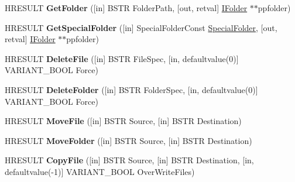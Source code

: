 \begin{DoxyCompactItemize}
H\+R\+E\+S\+U\+LT {\bfseries Get\+Folder} (\mbox{[}in\mbox{]} B\+S\+TR Folder\+Path, \mbox{[}out, retval\mbox{]} \hyperlink{interface_scripting_1_1_i_folder}{I\+Folder} $\ast$$\ast$ppfolder)
\item 
\mbox{\label{interface_scripting_1_1_i_file_system_aa405db394a3ce0ffc0cce3022d879d7f}} 
H\+R\+E\+S\+U\+LT {\bfseries Get\+Special\+Folder} (\mbox{[}in\mbox{]} Special\+Folder\+Const \hyperlink{struct_special_folder}{Special\+Folder}, \mbox{[}out, retval\mbox{]} \hyperlink{interface_scripting_1_1_i_folder}{I\+Folder} $\ast$$\ast$ppfolder)
\item 
\mbox{\label{interface_scripting_1_1_i_file_system_a863c0c4120d4fea8cbddd7c54b1f2ef7}} 
H\+R\+E\+S\+U\+LT {\bfseries Delete\+File} (\mbox{[}in\mbox{]} B\+S\+TR File\+Spec, \mbox{[}in, defaultvalue(0)\mbox{]} V\+A\+R\+I\+A\+N\+T\+\_\+\+B\+O\+OL Force)
\item 
\mbox{\label{interface_scripting_1_1_i_file_system_ace16983789ee7a3dc57136844d4358c1}} 
H\+R\+E\+S\+U\+LT {\bfseries Delete\+Folder} (\mbox{[}in\mbox{]} B\+S\+TR Folder\+Spec, \mbox{[}in, defaultvalue(0)\mbox{]} V\+A\+R\+I\+A\+N\+T\+\_\+\+B\+O\+OL Force)
\item 
\mbox{\label{interface_scripting_1_1_i_file_system_a6086db62d1cd219d38b3d4d2d19a3cf9}} 
H\+R\+E\+S\+U\+LT {\bfseries Move\+File} (\mbox{[}in\mbox{]} B\+S\+TR Source, \mbox{[}in\mbox{]} B\+S\+TR Destination)
\item 
\mbox{\label{interface_scripting_1_1_i_file_system_add043dcf0d363a3b3a920d311fc49eb6}} 
H\+R\+E\+S\+U\+LT {\bfseries Move\+Folder} (\mbox{[}in\mbox{]} B\+S\+TR Source, \mbox{[}in\mbox{]} B\+S\+TR Destination)
\item 
\mbox{\label{interface_scripting_1_1_i_file_system_aa1548a314113539a7dcb65d3d55b28c5}} 
H\+R\+E\+S\+U\+LT {\bfseries Copy\+File} (\mbox{[}in\mbox{]} B\+S\+TR Source, \mbox{[}in\mbox{]} B\+S\+TR Destination, \mbox{[}in, defaultvalue(-\/1)\mbox{]} V\+A\+R\+I\+A\+N\+T\+\_\+\+B\+O\+OL Over\+Write\+Files)
\item 
\mbox{\label{interface_scripting_1_1_i_file_system_a1de73b81e86d7c9e36d939d4607f4db3}} 

\end{DoxyCompactItemize}
